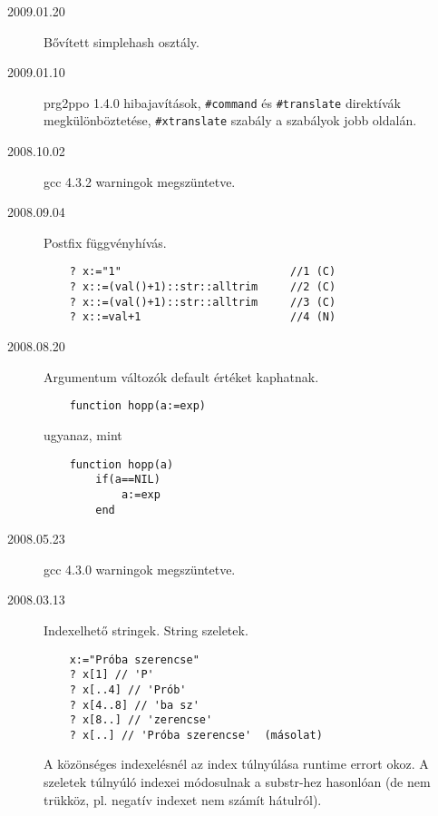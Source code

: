 
\begin{description}

\item[2009.01.20]
  Bővített simplehash osztály.\par

\item[2009.01.10]
  prg2ppo 1.4.0 
    hibajavítások,
    \verb!#command! és \verb!#translate! direktívák megkülönböztetése,
    \verb!#xtranslate! szabály a szabályok jobb oldalán.\par

\item[2008.10.02]
  gcc 4.3.2 warningok megszüntetve.\par

\item[2008.09.04]
   Postfix függvényhívás.
\begin{verbatim}
    ? x:="1"                          //1 (C)
    ? x::=(val()+1)::str::alltrim     //2 (C)
    ? x::=(val()+1)::str::alltrim     //3 (C)
    ? x::=val+1                       //4 (N)
\end{verbatim}

\item[2008.08.20]
  Argumentum változók default értéket kaphatnak.

\begin{verbatim}
    function hopp(a:=exp)
\end{verbatim}

  ugyanaz, mint  
  
\begin{verbatim}
    function hopp(a)
        if(a==NIL)
            a:=exp
        end
\end{verbatim}


\item[2008.05.23]
  gcc 4.3.0 warningok megszüntetve.\par

\label{20080313}
\item[2008.03.13]
  Indexelhető stringek. String szeletek.
\begin{verbatim}
    x:="Próba szerencse"
    ? x[1] // 'P'
    ? x[..4] // 'Prób'
    ? x[4..8] // 'ba sz'
    ? x[8..] // 'zerencse'
    ? x[..] // 'Próba szerencse'  (másolat)
\end{verbatim}
  A közönséges indexelésnél az index túlnyúlása runtime errort okoz. 
  A szeletek túlnyúló indexei módosulnak a substr-hez hasonlóan
  (de nem trükköz, pl. negatív indexet nem számít hátulról).\par
   


\end{description}
